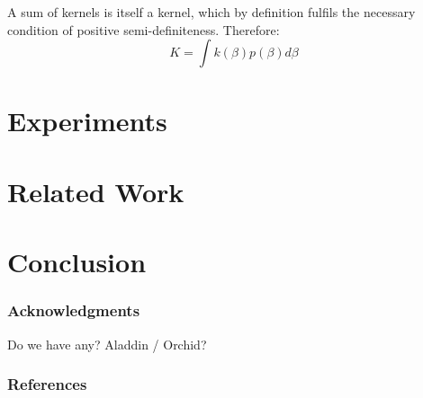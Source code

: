 \documentclass{article}
\begin{document}
A sum of kernels is itself a kernel, which by definition fulfils the necessary condition of positive semi-definiteness. Therefore:
\begin{equation}
K = \int k(\beta)p(\beta)d\beta
\end{equation}


\section{Experiments}




\section{Related Work}




\section{Conclusion}



\subsubsection*{Acknowledgments}
Do we have any? Aladdin / Orchid?


\subsubsection*{References}
\renewcommand{\refname}{\vskip -0.75cm}  %

\small{

}
\end{document}
